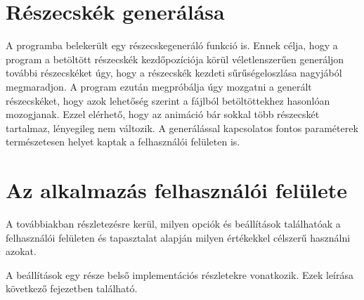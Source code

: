 \section{Részecskék generálása}

A programba belekerült egy részecskegeneráló funkció is. 
Ennek célja, hogy a program a betöltött részecskék 
kezdőpozíciója körül véletlenszerűen generáljon további részecskéket úgy, 
hogy a részecskék kezdeti sűrűségeloszlása nagyjából megmaradjon. 
A program ezután megpróbálja úgy mozgatni a generált részecskéket, 
hogy azok lehetőség szerint a fájlból betöltöttekhez hasonlóan mozogjanak. 
Ezzel elérhető, hogy az animáció 
bár sokkal több részecskét tartalmaz, 
lényegileg nem változik. 
A generálással kapcsolatos fontos paraméterek természetesen 
helyet kaptak a felhasználói felületen is.

\section{Az alkalmazás felhasználói felülete}

A továbbiakban részletezésre kerül, 
milyen opciók és beállítások találhatóak 
a felhasználói felületen és tapasztalat alapján 
milyen értékekkel célszerű használni azokat.

A beállítások egy része belső implementációs részletekre vonatkozik.
Ezek leírása következő fejezetben található. 

